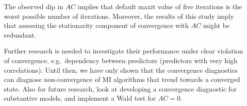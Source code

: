 \documentclass[Royal,times,sageh]{sagej}
\begin{document}
The observed dip in \(AC\) implies that default maxit value of five
iterations is the worst possible number of iterations. Moreover, the
results of this study imply that assessing the stationarity component of
convergence with \(AC\) might be redundant.

Further research is needed to investigate their performance under clear
violation of convergence, e.g.~dependency between predictors (predictors
with very high correlations). Until then, we have only shown that the
convergence diagnostics can diagnose non-convergence of MI algorithms
that trend towards a converged state. Also for future research, look at
developing a convergence diagnostic for substantive models, and
implement a Wald test for \(AC = 0\).



\end{document}
